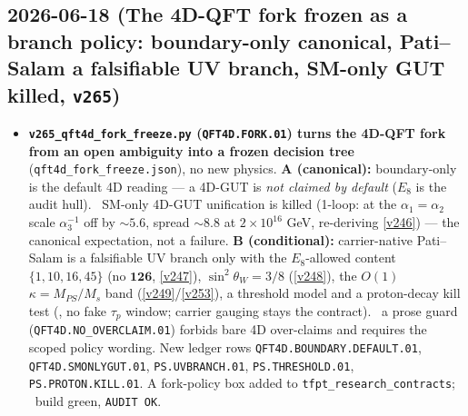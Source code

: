 \subsection*{2026-06-18 (The 4D-QFT fork frozen as a branch policy: boundary-only canonical, Pati--Salam a falsifiable UV branch, SM-only GUT killed, \texttt{v265})}
\begin{itemize}
\item \textbf{\texttt{v265\_qft4d\_fork\_freeze.py} (\texttt{QFT4D.FORK.01}) turns the 4D-QFT fork from an open
  ambiguity into a frozen decision tree} (\texttt{qft4d\_fork\_freeze.json}), no new physics. \textbf{A
  (canonical):} boundary-only is the default 4D reading --- a 4D-GUT is \emph{not claimed by default}
  ($E_8$ is the audit hull). \mX\ SM-only 4D-GUT unification is killed (1-loop: at the
  $\alpha_1{=}\alpha_2$ scale $\alpha_3^{-1}$ off by ${\sim}5.6$, spread ${\sim}8.8$ at $2{\times}10^{16}$
  GeV, re-deriving \vref{v246}) --- the canonical expectation, not a failure. \textbf{B (conditional):}
  carrier-native Pati--Salam is a falsifiable UV branch only with the $E_8$-allowed content
  $\{1,10,16,45\}$ (no $\mathbf{126}$, \vref{v247}), $\sin^2\theta_W{=}3/8$ (\vref{v248}), the $O(1)$
  $\kappa{=}M_{PS}/M_s$ band (\vref{v249}/\vref{v253}), a threshold model and a proton-decay kill test
  (\mX, no fake $\tau_p$ window; carrier gauging stays the contract). \mE\ a prose guard
  (\texttt{QFT4D.NO\_OVERCLAIM.01}) forbids bare 4D over-claims and requires the scoped policy wording. New
  ledger rows \texttt{QFT4D.BOUNDARY.DEFAULT.01}, \texttt{QFT4D.SMONLYGUT.01}, \texttt{PS.UVBRANCH.01},
  \texttt{PS.THRESHOLD.01}, \texttt{PS.PROTON.KILL.01}. A fork-policy box added to
  \texttt{tfpt\_research\_contracts}; \mE\ build green, \texttt{AUDIT OK}.
\end{itemize}

